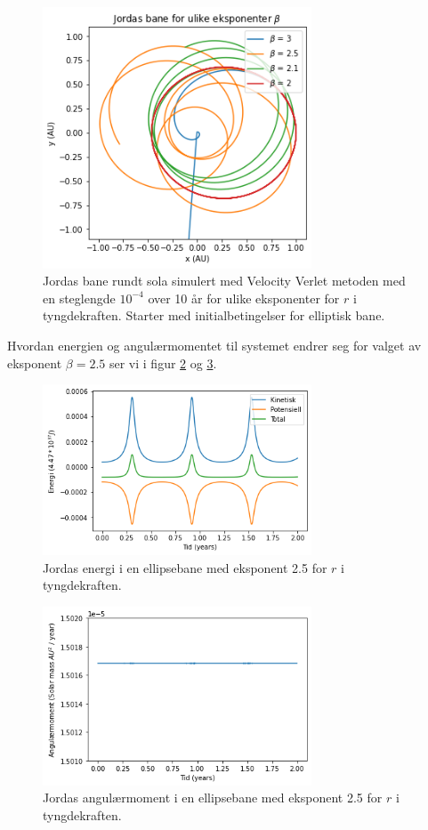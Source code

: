 \documentclass[reprint,english,notitlepage]{revtex4-1}
\begin{document}
	\begin{figure}[H]
		\includegraphics[width=80mm]{../Code/Figures/betaell.png}
		\caption{Jordas bane rundt sola simulert med Velocity Verlet metoden med en steglengde $10^{-4}$ over 10 år for ulike eksponenter for $r$ i tyngdekraften. Starter med initialbetingelser for elliptisk bane.}
		\label{fig:betaell}
	\end{figure}
	Hvordan energien og angulærmomentet til systemet endrer seg for valget av eksponent $\beta = 2.5$ ser vi i figur \ref{fig:betaen} og \ref{fig:betaang}.

	\begin{figure}[H]
		\includegraphics[width=80mm]{../Code/Figures/betaen.png}
		\caption{Jordas energi i en ellipsebane med eksponent 2.5 for $r$ i tyngdekraften.}
		\label{fig:betaen}
	\end{figure}

	\begin{figure}[H]
		\includegraphics[width=80mm]{../Code/Figures/betaang.png}
		\caption{Jordas angulærmoment i en ellipsebane med eksponent 2.5 for $r$ i tyngdekraften.}
		\label{fig:betaang}
	\end{figure}
\end{document}
